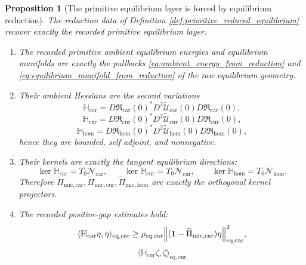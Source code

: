 \documentclass[11pt]{article}
\newcommand{\TensorAmbientHess}{\mathbb H_{\mathrm{car}}}
\newcommand{\CurAmbientHess}{\mathbb H_{\mathrm{cur}}}
\newcommand{\HomAmbientHess}{\mathbb H_{\mathrm{hom}}}
\newcommand{\TensorEqKerProj}{\widetilde\Pi_{\mathrm{mic,car}}}
\newcommand{\CurEqKerProj}{\widetilde\Pi_{\mathrm{mic,cur}}}
\newcommand{\HomEqKerProj}{\widetilde\Pi_{\mathrm{mic,hom}}}
\newcommand{\EqCarGap}{\rho_{\mathrm{eq,car}}}
\newcommand{\TensorEqManifold}{\mathcal N_{\mathrm{car}}}
\newcommand{\CurEqManifold}{\mathcal N_{\mathrm{cur}}}
\newcommand{\HomEqManifold}{\mathcal N_{\mathrm{hom}}}
\newcommand{\TensorEqReduce}{\mathfrak R_{\mathrm{car}}}
\newcommand{\CurEqReduce}{\mathfrak R_{\mathrm{cur}}}
\newcommand{\HomEqReduce}{\mathfrak R_{\mathrm{hom}}}
\newcommand{\TensorRawEnergy}{\widetilde{\mathcal U}_{\mathrm{car}}}
\newcommand{\CurRawEnergy}{\widetilde{\mathcal U}_{\mathrm{cur}}}
\newcommand{\HomRawEnergy}{\widetilde{\mathcal U}_{\mathrm{hom}}}
\newtheorem{proposition}{Proposition}
\begin{document}
\begin{proposition}[The primitive equilibrium layer is forced by equilibrium reduction]
\label{prop:equilibrium_from_reduction}
The reduction data of Definition \ref{def:primitive_reduced_equilibrium} recover exactly the recorded primitive equilibrium layer.
\begin{enumerate}
    \item The recorded primitive ambient equilibrium energies and equilibrium manifolds are exactly the pullbacks \eqref{eq:ambient_energy_from_reduction} and \eqref{eq:equilibrium_manifold_from_reduction} of the raw equilibrium geometry.
    \item Their ambient Hessians are the second variations
    \begin{equation}
    \TensorAmbientHess
    =
    D\TensorEqReduce(0)^*D^2\TensorRawEnergy(0)D\TensorEqReduce(0),
    \label{eq:ambient_hessian_from_reduction_car}
    \end{equation}
    \begin{equation}
    \CurAmbientHess
    =
    D\CurEqReduce(0)^*D^2\CurRawEnergy(0)D\CurEqReduce(0),
    \label{eq:ambient_hessian_from_reduction_cur}
    \end{equation}
    \begin{equation}
    \HomAmbientHess
    =
    D\HomEqReduce(0)^*D^2\HomRawEnergy(0)D\HomEqReduce(0),
    \label{eq:ambient_hessian_from_reduction_hom}
    \end{equation}
    hence they are bounded, self adjoint, and nonnegative.
    \item Their kernels are exactly the tangent equilibrium directions:
    \begin{equation}
    \ker\TensorAmbientHess=T_0\TensorEqManifold,\qquad
    \ker\CurAmbientHess=T_0\CurEqManifold,\qquad
    \ker\HomAmbientHess=T_0\HomEqManifold.
    \label{eq:kernels_from_reduction}
    \end{equation}
    Therefore \(\TensorEqKerProj,\CurEqKerProj,\HomEqKerProj\) are exactly the orthogonal kernel projectors.
    \item The recorded positive-gap estimates hold:
    \begin{equation}
    \langle \TensorAmbientHess\eta,\eta\rangle_{\mathrm{eq,car}}
    \ge
    \EqCarGap\norm{(\mathbf 1-\TensorEqKerProj)\eta}_{\mathrm{eq,car}}^2,
    \label{eq:visible_hessian_gap_car}
    \end{equation}
    \begin{equation}
    \langle \CurAmbientHess\zeta,\zeta\rangle_{\mathrm{eq,cur}}

\end{equation}
\end{enumerate}
\end{proposition}
\end{document}
